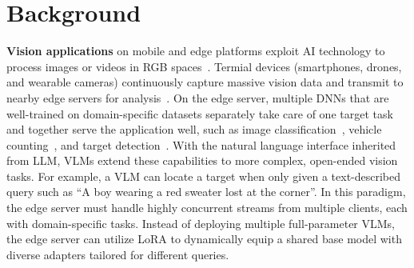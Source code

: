 \section{Background}\label{sec:backgound}

\noindent
\textbf{Vision applications} on mobile and edge platforms exploit AI technology to process images or videos in RGB spaces~\cite{zhang2018awstream, khani2023recl, Romil2022Ekya}.
Termial devices (\eg smartphones, drones, and wearable cameras) continuously capture massive vision data and transmit to nearby edge servers for analysis~\cite{xu2025joint, dai2024context}.
On the edge server, multiple DNNs that are well-trained on domain-specific datasets separately take care of one target task and together serve the application well, such as image classification~\cite{yuan2022PacketGame, kang2022viva}, vehicle counting~\cite{li2020reducto, kang2017noscope}, and target detection~\cite{du2020server, yu2024vqpy}.
With the natural language interface inherited from LLM, VLMs extend these capabilities to more complex, open-ended vision tasks.
For example, a VLM can locate a target when only given a text-described query such as ``A boy wearing a red sweater lost at the corner''.
In this paradigm, the edge server must handle highly concurrent streams from multiple clients, each with domain-specific tasks.
Instead of deploying multiple full-parameter VLMs, the edge server can utilize LoRA to dynamically equip a shared base model with diverse adapters tailored for different queries.


